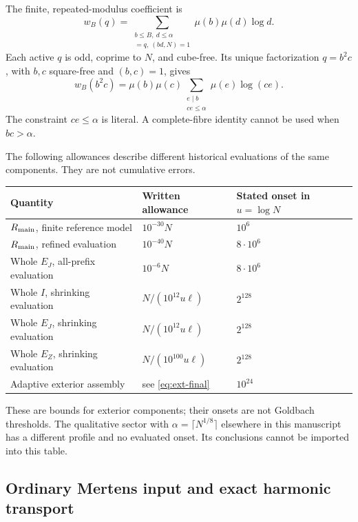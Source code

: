 \documentclass[11pt,a4paper]{article}
\theoremstyle{definition}
\theoremstyle{remark}
\begin{document}
The finite, repeated-modulus coefficient is
\begin{equation}\label{eq:ext-w}
 w_B(q)=\sum_{\substack{b\leq B,\ d\leq\alpha\\
                 [b^2,d]=q,\ (bd,N)=1}}
                   \mu(b)\mu(d)\log d.
\end{equation}
Each active $q$ is odd, coprime to $N$, and cube-free. Its unique
factorization $q=b^2c$, with $b,c$ square-free and $(b,c)=1$, gives
\begin{equation}\label{eq:ext-fibre}
 w_B(b^2c)=\mu(b)\mu(c)
       \sum_{\substack{e\mid b\\ce\leq\alpha}}\mu(e)\log(ce).
\end{equation}
The constraint $ce\leq\alpha$ is literal. A complete-fibre identity
cannot be used when $bc>\alpha$.

The following allowances describe different historical evaluations of the
same components. They are not cumulative errors.
\begin{center}
\begin{tabular}{lll}
\hline
Quantity & Written allowance & Stated onset in $u=\log N$\\
\hline
$R_{\rm main}$, finite reference model & $10^{-30}N$ & $10^6$\\
$R_{\rm main}$, refined evaluation & $10^{-40}N$ & $8\cdot10^6$\\
Whole $E_J$, all-prefix evaluation & $10^{-6}N$ & $8\cdot10^6$\\
Whole $I$, shrinking evaluation & $N/(10^{12}u\ell)$ & $2^{128}$\\
Whole $E_J$, shrinking evaluation & $N/(10^{12}u\ell)$ & $2^{128}$\\
Whole $E_Z$, shrinking evaluation & $N/(10^{100}u\ell)$ & $2^{128}$\\
Adaptive exterior assembly & see \eqref{eq:ext-final} & $10^{24}$\\
\hline
\end{tabular}
\end{center}
These are bounds for exterior components; their onsets are not Goldbach
thresholds. The qualitative sector with $\alpha=\lceil N^{1/8}\rceil$
elsewhere in this manuscript has a different profile and no evaluated
onset. Its conclusions cannot be imported into this table.

\subsection{Ordinary Mertens input and exact harmonic transport}
\end{document}
